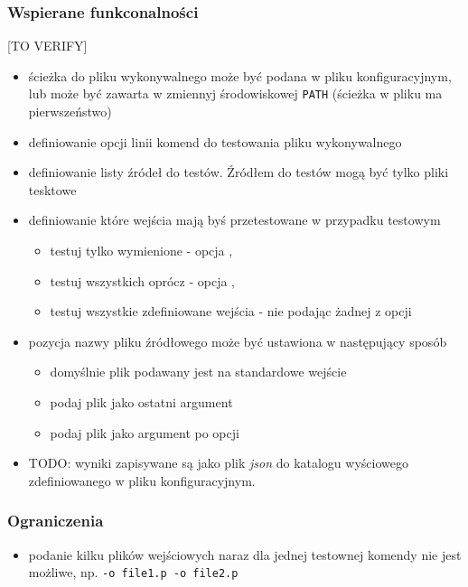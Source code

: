 \documentclass[a4paper,12pt]{article}
\begin{document}
\subsubsection{Wspierane funkconalności}
[TO VERIFY]
\begin{itemize}
  \item ścieżka do pliku wykonywalnego może być podana w pliku konfiguracyjnym, lub może być zawarta w zmiennyj środowiskowej \texttt{PATH} (ścieżka w pliku ma pierwszeństwo)
  \item definiowanie opcji linii komend do testowania pliku wykonywalnego
  \item definiowanie listy źródeł do testów. Źródłem do testów mogą być tylko pliki tesktowe
  \item definiowanie które wejścia mają byś przetestowane w przypadku testowym
    \begin{itemize}
      \item testuj tylko wymienione - opcja ,
      \item testuj wszystkich oprócz - opcja ,
      \item testuj wszystkie zdefiniowane wejścia - nie podając żadnej z opcji
    \end{itemize}
  \item pozycja nazwy pliku źródłowego może być ustawiona w następujący sposób
    \begin{itemize}
      \item domyślnie plik podawany jest na standardowe wejście
      \item podaj plik jako ostatni argument 
      \item podaj plik jako argument po opcji 
    \end{itemize}
  \item TODO: wyniki zapisywane są jako plik \textit{json} do katalogu wyściowego zdefiniowanego w pliku konfiguracyjnym.
\end{itemize}

\subsubsection{Ograniczenia}

\begin{itemize}
  \item podanie kilku plików wejściowych naraz dla jednej testownej komendy nie jest możliwe, np. \texttt{-o file1.p -o file2.p}
\end{itemize}
\end{document}
